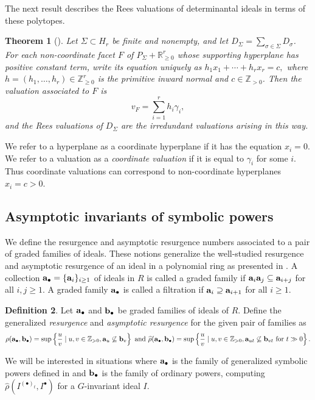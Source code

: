 \documentclass[11pt, reqno]{amsart}
\numberwithin{equation}{section}
\newtheorem{theorem}{Theorem}[section]
\theoremstyle{definition}
\newtheorem{definition}[theorem]{Definition}
\newcommand{\ZZ}{{\mathbb Z}}
\newcommand{\RR}{{\mathbb R}}
\def\a{{\bf a}}
\def\b{{\bf b}}
\begin{document}
The next result describes the Rees valuations of determinantal ideals in terms of these polytopes.

\begin{theorem}[{\cite[Theorem 3.13]{bdhmrational}}]\label{thm: Rees_valuations}
Let $\Sigma\subset H_r$ be finite and nonempty, and let $D_\Sigma=\sum_{\sigma\in\Sigma}D_\sigma$. For each non-coordinate facet $F$ of
$
P_\Sigma+\RR_{\geq0}^r
$
whose supporting hyperplane has positive constant term, write its equation uniquely as
$
h_1x_1+\cdots+h_rx_r=c,
$
where $h=(h_1,\ldots,h_r)\in\ZZ_{\geq0}^r$ is the primitive inward normal and $c\in\ZZ_{>0}$. Then the valuation associated to $F$ is
\[
v_F=\sum_{i=1}^r h_i\gamma_i,
\]
and the Rees valuations of $D_\Sigma$  are the irredundant valuations arising in this way.  \end{theorem}

We refer to a hyperplane as a coordinate hyperplane if it has the equation $x_i=0$. We refer to a valuation as a {\em coordinate valuation} if it is equal to $\gamma_i$ for some $i$. Thus coordinate valuations can correspond to non-coordinate hyperplanes $x_i=c>0$.

\subsection{Asymptotic invariants of symbolic powers}\label{ss: asymptotic}

 We define the resurgence and asymptotic resurgence numbers associated to a pair of graded families of ideals. These notions generalize the well-studied resurgence and asymptotic resurgence of an ideal in a polynomial ring as presented in  . A collection $\a_\bullet = \{\a_i\}_{i\geq 1}$ of ideals in $R$ is called a graded family if $\a_i\a_j \subseteq \a_{i+j}$ for all $i,j \geq 1$. A graded family $\a_\bullet$ is called a filtration if $\a_i \supseteq \a_{i+1}$ for all $i \geq1$.

 \begin{definition}
 Let $\a_\bullet$ and $\b_\bullet$ be graded families of ideals of $R$. Define the generalized {\em resurgence} and {\em asymptotic resurgence} for the given pair of families as
\[
 \rho(\a_\bullet, \b_\bullet)=\sup\left \{\frac{u}{v} \mid u,v\in\mathbb Z_{>0}, \a_u\not\subseteq \b_v\right \} \text{ and } \widehat{\rho}(\a_\bullet,\b_\bullet)=\sup\left \{\frac{u}{v} \mid u,v\in\mathbb Z_{>0}, \a_{ut} \not\subseteq \b_{vt} \text{ for }t\gg0 \right \}.
 \]
 \end{definition}
We will be interested in situations where $\a_\bullet$ is the family of generalized symbolic powers defined in  and $\b_\bullet$ is the family of ordinary powers,  computing $ \widehat{\rho}(I^{(\bullet)_t},I^\bullet)$ for a $G$-invariant ideal $I$.
\end{document}
